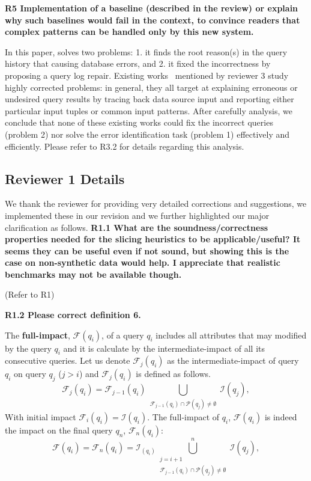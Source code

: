 \noindent \textbf{R5 Implementation of a baseline (described in the review) or explain why such baselines would fail in the context, to convince readers that complex patterns can be handled only by this new system.}

In this paper, \sys solves two problems: 1. it finds the root reason(s) in the query history that causing database errors, and 2. it fixed the incorrectness by proposing a query log repair. Existing works~\cite{Wu13, roy2014formal, chalamalla2014,meliou2011tracing} mentioned by reviewer 3 study highly corrected problems: in general, they all target at explaining erroneous or undesired query results by tracing back data source input and reporting either particular input tuples or common input patterns. After carefully analysis, we conclude that none of these existing works could fix the incorrect queries (problem 2) nor solve the error identification task (problem 1) effectively and efficiently.  Please refer to R3.2 for details regarding this analysis.


\subsection*{Reviewer 1 Details}
We thank the reviewer for providing very detailed corrections and suggestions, we implemented these in our revision and we further highlighted our major clarification as follows.
\noindent \textbf{R1.1 What are the soundness/correctness properties needed for the slicing heuristics to be applicable/useful? It seems they can be useful even if not sound, but showing this is the case on non-synthetic data would help. I appreciate that realistic benchmarks may not be available though.}

(Refer to R1)

\noindent \textbf{R1.2 Please correct definition 6.} 

The \textbf{full-impact}, $\mathcal{F}(q_i)$, of a query $q_i$ includes all attributes that may modified by the query $q_i$ and it is calculate by the intermediate-impact of all its consecutive queries. Let us denote $\mathcal{F}_j(q_i)$ as the intermediate-impact of query $q_i$ on query $q_j$ ($j > i$) and $\mathcal{F}_j(q_i)$ is defined as follows.
 \[
    \mathcal{F}_j(q_i)=\mathcal{F}_{j-1}(q_i)\bigcup_{\substack{\mathcal{F}_{j-1}(q_i)\cap \mathcal{P}(q_j) \neq \emptyset}} \mathcal{I}(q_j),
 \]
With initial impact $\mathcal{F}_i(q_i)  = \mathcal{I}(q_i)$. The full-impact of $q_i$, $\mathcal{F}(q_i)$ is indeed the impact on the final query $q_n$, $\mathcal{F}_n(q_i)$:
\[
	\mathcal{F}(q_i)=\mathcal{F}_n(q_i) = \mathcal{I}_(q_i)\bigcup_{\substack{j = i+1 \\ \mathcal{F}_{j-1}(q_i)\cap \mathcal{P}(q_j) \neq \emptyset}}^n \mathcal{I}(q_j),
\] 

